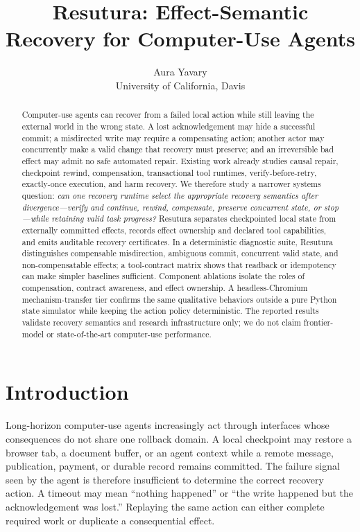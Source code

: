 \documentclass{article}
\title{Resutura: Effect-Semantic Recovery for Computer-Use Agents}
\author{%
Aura Yavary\\
University of California, Davis
}
\begin{document}
\maketitle

\begin{abstract}
Computer-use agents can recover from a failed local action while still leaving the external world in the wrong state. A lost acknowledgement may hide a successful commit; a misdirected write may require a compensating action; another actor may concurrently make a valid change that recovery must preserve; and an irreversible bad effect may admit no safe automated repair. Existing work already studies causal repair, checkpoint rewind, compensation, transactional tool runtimes, verify-before-retry, exactly-once execution, and harm recovery. We therefore study a narrower systems question: \emph{can one recovery runtime select the appropriate recovery semantics after divergence---verify and continue, rewind, compensate, preserve concurrent state, or stop---while retaining valid task progress?} Resutura separates checkpointed local state from externally committed effects, records effect ownership and declared tool capabilities, and emits auditable recovery certificates. In a deterministic diagnostic suite, Resutura distinguishes compensable misdirection, ambiguous commit, concurrent valid state, and non-compensatable effects; a tool-contract matrix shows that readback or idempotency can make simpler baselines sufficient. Component ablations isolate the roles of compensation, contract awareness, and effect ownership. A headless-Chromium mechanism-transfer tier confirms the same qualitative behaviors outside a pure Python state simulator while keeping the action policy deterministic. The reported results validate recovery semantics and research infrastructure only; we do not claim frontier-model or state-of-the-art computer-use performance.
\end{abstract}

\section{Introduction}
Long-horizon computer-use agents increasingly act through interfaces whose consequences do not share one rollback domain. A local checkpoint may restore a browser tab, a document buffer, or an agent context while a remote message, publication, payment, or durable record remains committed. The failure signal seen by the agent is therefore insufficient to determine the correct recovery action. A timeout may mean ``nothing happened'' or ``the write happened but the acknowledgement was lost.'' Replaying the same action can either complete required work or duplicate a consequential effect.
\end{document}
